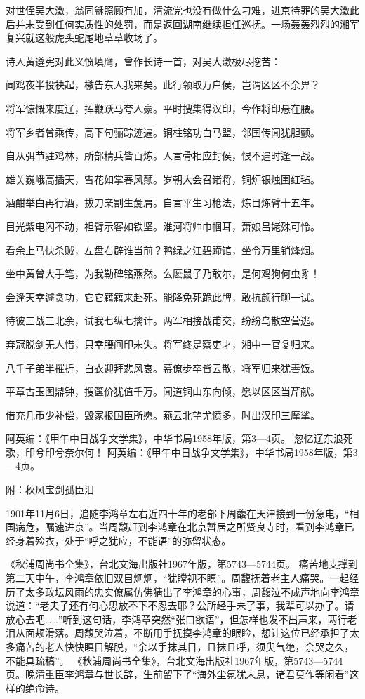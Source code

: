 \documentclass[12pt,UTF8]{ctexbook}
\begin{document}
对世侄吴大澂，翁同龢照顾有加，清流党也没有做什么刁难，进京待罪的吴大澂此后并未受到任何实质性的处罚，而是返回湖南继续担任巡抚。一场轰轰烈烈的湘军复兴就这般虎头蛇尾地草草收场了。

诗人黄遵宪对此义愤填膺，曾作长诗一首，对吴大澂极尽挖苦：

闻鸡夜半投袂起，檄告东人我来矣。此行领取万户侯，岂谓区区不余畀？

将军慷慨来度辽，挥鞭跃马夸人豪。平时搜集得汉印，今作将印悬在腰。

将军乡者曾乘传，高下句骊踪迹遍。铜柱铭功白马盟，邻国传闻犹胆颤。

自从弭节驻鸡林，所部精兵皆百炼。人言骨相应封侯，恨不遇时逢一战。

雄关巍峨高插天，雪花如掌春风颠。岁朝大会召诸将，铜炉银烛围红毡。

酒酣举白再行酒，拔刀亲割生彘肩。自言平生习枪法，炼目炼臂十五年。

目光紫电闪不动，袒臂示客如铁坚。淮河将帅巾帼耳，萧娘吕姥殊可怜。

看余上马快杀贼，左盘右辟谁当前？鸭绿之江碧蹄馆，坐令万里销烽烟。

坐中黄曾大手笔，为我勒碑铭燕然。么麽鼠子乃敢尔，是何鸡狗何虫豸！

会逢天幸遽贪功，它它籍籍来赴死。能降免死跪此牌，敢抗颜行聊一试。

待彼三战三北余，试我七纵七擒计。两军相接战甫交，纷纷鸟散空营逃。

弃冠脱剑无人惜，只幸腰间印未失。将军终是察吏才，湘中一官复归来。

八千子弟半摧折，白衣迎拜悲风哀。幕僚步卒皆云散，将军归来犹善饭。

平章古玉图鼎钟，搜箧价犹值千万。闻道铜山东向倾，愿以区区当芹献。

借充几币少补偿，毁家报国臣所愿。燕云北望尤愤多，时出汉印三摩挲。

阿英编：《甲午中日战争文学集》，中华书局1958年版，第3—4页。
忽忆辽东浪死歌，印兮印兮奈尔何！ 阿英编：《甲午中日战争文学集》，中华书局1958年版，第3—4页。

附：秋风宝剑孤臣泪

1901年11月6日，追随李鸿章左右近四十年的老部下周馥在天津接到一份急电，“相国病危，嘱速进京”。当周馥赶到李鸿章在北京暂居之所贤良寺时，看到李鸿章已经身着殓衣，处于“呼之犹应，不能语”的弥留状态。

《秋浦周尚书全集》，台北文海出版社1967年版，第5743—5744页。
痛苦地支撑到第二天中午，李鸿章依旧双目炯炯，“犹瞠视不瞑”。周馥抚着老主人痛哭。一起经历了太多政坛风雨的忠实僚属仿佛猜出了李鸿章的心事，周馥泣不成声地向李鸿章说道：“老夫子还有何心思放不下不忍去耶？公所经手未了事，我辈可以办了。请放心去吧……”听到这句话，李鸿章突然“张口欲语”，但怎样也发不出声来，两行老泪从面颊滑落。周馥哭泣着，不断用手抚摸李鸿章的眼睑，想让这位已经承担了太多痛苦的老人快快瞑目解脱，“余以手抹其目，且抹且呼，须臾气绝，余哭之久，不能具疏稿”。 《秋浦周尚书全集》，台北文海出版社1967年版，第5743—5744页。晚清重臣李鸿章与世长辞，生前留下了“海外尘氛犹未息，诸君莫作等闲看”这样的绝命诗。
\end{document}
